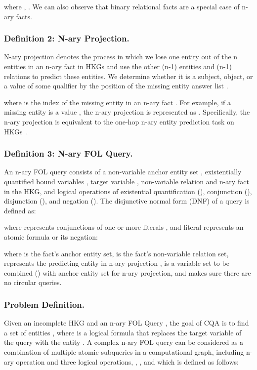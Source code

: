 \documentclass[letterpaper]{article} \usepackage{aaai23}  \usepackage{times}  \usepackage{helvet}  \usepackage{courier}  \usepackage[hyphens]{url}  \usepackage{graphicx} \urlstyle{rm} \def\UrlFont{\rm}  \usepackage{natbib}  \usepackage{caption} \frenchspacing  \setlength{\pdfpagewidth}{8.5in}  \setlength{\pdfpageheight}{11in}  \usepackage{algorithm}
\begin{document}
where , . We can also observe that binary relational facts are a special case of n-ary facts.

\subsubsection{Definition 2: N-ary Projection.}
N-ary projection denotes the process in which we lose one entity out of the n entities in an n-ary fact in HKGs and use the other (n-1) entities and (n-1) relations to predict these entities. We determine whether it is a subject, object, or a value of some qualifier by the position  of the missing entity answer list . 

where  is the index of the missing entity in an n-ary fact . For example, if a missing entity is a value , the n-ary projection is represented as . Specifically, the n-ary projection is equivalent to the one-hop n-ary entity prediction task on HKGs~\citep{GRAN}.

\subsubsection{Definition 3: N-ary FOL Query.} 
An n-ary FOL query  consists of a non-variable anchor entity set , existentially quantified bound variables , target variable , non-variable relation  and n-ary fact  in the HKG, and logical operations of existential quantification (), conjunction (), disjunction (), and negation (). The disjunctive normal form (DNF) of a query  is defined as:


where  represents conjunctions of one or more literals , and literal  represents an atomic formula or its negation:

where  is the fact's anchor entity set,  is the fact's non-variable relation set,  represents the predicting entity in n-ary projection ,  is a variable set to be combined () with anchor entity set  for n-ary projection, and  makes sure there are no circular queries.

\subsubsection{Problem Definition.}
Given an incomplete HKG  and an n-ary FOL Query , the goal of CQA is to find a set of entities , where  is a logical formula that replaces the target variable  of the query with the entity .
A complex n-ary FOL query can be considered as a combination of multiple atomic subqueries  in a computational graph, including n-ary  operation and three logical operations, , , and  which is defined as follows:
\end{document}
